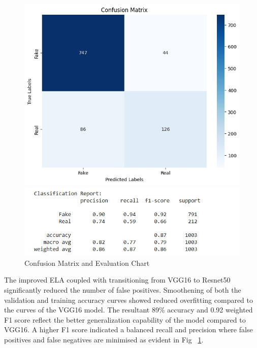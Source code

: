 \documentclass{ieeeaccess}
\begin{document}
 
 \begin{figure}[h!]
 	\centering
 	\begin{minipage}{0.32\textwidth}
 		\centering
 		\includegraphics[width=\linewidth]{Confusion_Matrix.jpg}
 	\end{minipage}
 	\hfill
 	\begin{minipage}{0.32\textwidth}
 		\centering
 		\includegraphics[width=\linewidth]{Chart_EM.jpg}
 		
 	\end{minipage}
 	\caption{Confusion Matrix and Evaluation Chart}
 	\label{fig:Confusion Matrix}
 \end{figure}
 The improved ELA coupled with transitioning from VGG16 to Resnet50 significantly reduced the number of false positives. Smoothening of both the validation and training accuracy curves showed reduced overfitting compared to the curves of the VGG16 model. The resultant 89\% accuracy and 0.92 weighted F1 score reflect the better generalization capability of the model compared to VGG16. A higher F1 score indicated a balanced recall and precision where false positives and false negatives are minimised as evident in Fig ~\ref{fig:Confusion Matrix}. 
 
\end{document}
